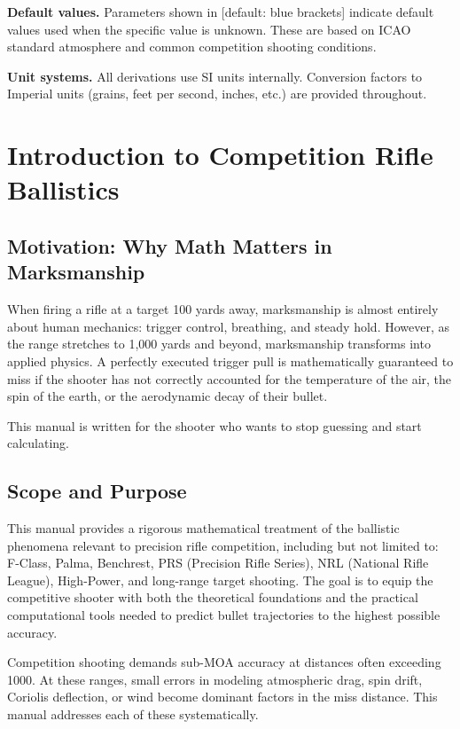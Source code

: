 \documentclass[11pt,twoside,openright]{report}
\newcommand{\default}[1]{\;\textrm{\textcolor{blue!60!black}{[default: #1]}}}
\begin{document}
\textbf{Default values.} Parameters shown in \default{blue brackets} indicate default values used when the specific value is unknown. These are based on ICAO standard atmosphere and common competition shooting conditions.

\textbf{Unit systems.} All derivations use SI units internally. Conversion factors to Imperial units (grains, feet per second, inches, etc.) are provided throughout.

\newpage
{}
\setcounter{page}{1}

\chapter{Introduction to Competition Rifle Ballistics}
\label{ch:intro}

\section{Motivation: Why Math Matters in Marksmanship}

When firing a rifle at a target 100 yards away, marksmanship is almost entirely about human mechanics: trigger control, breathing, and steady hold. However, as the range stretches to 1,000 yards and beyond, marksmanship transforms into applied physics. A perfectly executed trigger pull is mathematically guaranteed to miss if the shooter has not correctly accounted for the temperature of the air, the spin of the earth, or the aerodynamic decay of their bullet. 

This manual is written for the shooter who wants to stop guessing and start calculating.

\section{Scope and Purpose}

This manual provides a rigorous mathematical treatment of the ballistic phenomena relevant to precision rifle competition, including but not limited to: F-Class, Palma, Benchrest, PRS (Precision Rifle Series), NRL (National Rifle League), High-Power, and long-range target shooting. The goal is to equip the competitive shooter with both the theoretical foundations and the practical computational tools needed to predict bullet trajectories to the highest possible accuracy.

Competition shooting demands sub-MOA accuracy at distances often exceeding \SI{1000}{\yard}. At these ranges, small errors in modeling atmospheric drag, spin drift, Coriolis deflection, or wind become dominant factors in the miss distance. This manual addresses each of these systematically.
\end{document}
